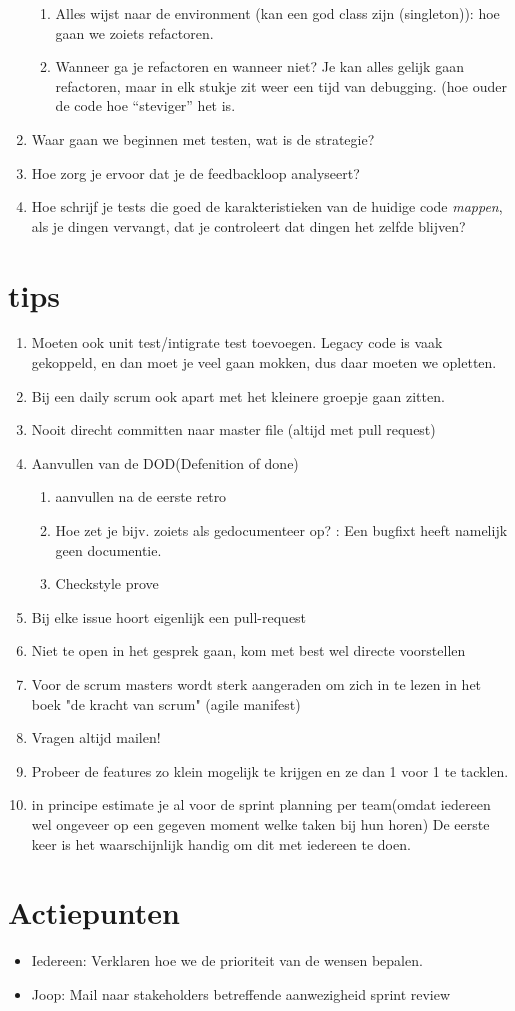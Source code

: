 \documentclass{article}
\begin{document}
\begin{enumerate}
\begin{enumerate}
\item Alles wijst naar de environment (kan een god class zijn (singleton)): hoe gaan we zoiets refactoren. 
\item Wanneer ga je refactoren en wanneer niet? Je kan alles gelijk gaan refactoren, maar in elk stukje zit weer een tijd van debugging. (hoe ouder de code hoe “steviger” het is.
\end{enumerate}
\item Waar gaan we beginnen met testen, wat is de strategie? 
\item Hoe zorg je ervoor dat je de feedbackloop analyseert? 
\item Hoe schrijf je tests die goed de karakteristieken van de huidige code \emph{mappen}, als je dingen vervangt, dat je controleert dat dingen het zelfde blijven?  
\end{enumerate}

\section{tips}
\begin{enumerate}
\item Moeten ook unit test/intigrate test toevoegen. Legacy code is vaak gekoppeld, en dan moet je veel gaan mokken, dus daar moeten we opletten. 
\item Bij een daily scrum ook apart met het kleinere groepje gaan zitten. 
\item Nooit direcht committen naar master file (altijd met pull request) 
\item Aanvullen van de DOD(Defenition of done) 
\begin{enumerate}
\item aanvullen na de eerste retro
\item Hoe zet je bijv. zoiets als gedocumenteer op? : Een bugfixt heeft namelijk geen documentie. 
\item Checkstyle prove 
\end{enumerate}
\item Bij elke issue hoort eigenlijk een pull-request
\item Niet te open in het gesprek gaan, kom met best wel directe voorstellen
\item Voor de scrum masters wordt sterk aangeraden om zich in te lezen in het boek "de kracht van scrum" (agile manifest) 
\item Vragen altijd mailen!
\item Probeer de features zo klein mogelijk te krijgen en ze dan 1  voor 1 te tacklen. 
\item in principe estimate je al voor de sprint planning per team(omdat iedereen wel ongeveer op een gegeven moment welke taken bij hun horen) De eerste keer is het waarschijnlijk handig om dit met iedereen te doen. 
\end{enumerate}
 



\section{Actiepunten}
\begin{itemize}
\item Iedereen: Verklaren hoe we de prioriteit van de wensen bepalen. 
\item Joop: Mail naar stakeholders betreffende aanwezigheid sprint review
\end{itemize}
\end{document}
